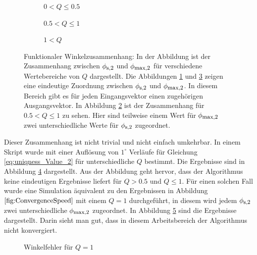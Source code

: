 	
\begin{figure}
\centering
	\begin{subfigure}{0.3\textwidth}
		\caption{$0<Q\leq0.5$}
		\label{fig:0_05_Unique}
	\end{subfigure}
	\hspace{1mm}
	\begin{subfigure}{0.3\textwidth}
		\caption{$0.5<Q\leq1$}
		\label{fig:05_10_unique}
	\end{subfigure}
		\hspace{1mm}
	\begin{subfigure}{0.3\textwidth}
		\caption{$1<Q$}
		\label{fig:bigger1_unique}
	\end{subfigure}
	\caption{ Funktionaler Winkelzusammenhang: In der Abbildung ist der Zusammenhang zwischen $\phi_{\textrm{\footnotesize{s,2}}}$ und $\phi_{\textrm{\footnotesize{max,2}}}$ für verschiedene Wertebereiche von $Q$ dargestellt. Die Abbildungen \ref{fig:0_05_Unique} und \ref{fig:bigger1_unique} zeigen eine eindeutige Zuordnung zwischen $\phi_{\textrm{\footnotesize{s,2}}}$ und $\phi_{\textrm{\footnotesize{max,2}}}$. In diesem Bereich gibt es für jeden Eingangsvektor einen zugehörigen Ausgangsvektor. In Abbildung \ref{fig:05_10_unique} ist der Zusammenhang für $0.5 < Q \leq 1$ zu sehen. Hier sind teilweise einem Wert für $\phi_{\textrm{\footnotesize{max,2}}}$ zwei unterschiedliche Werte für $\phi_{\textrm{\footnotesize{s,2}}}$ zugeordnet.}
	\label{fig:uniqueness}
\end{figure}

Dieser Zusammenhang ist nicht trivial und nicht einfach umkehrbar. In einem Skript wurde mit einer Auflösung von $1^\circ$ Verläufe für Gleichung \ref{eq:uniqness_Value_2} für unterschiedliche $Q$ bestimmt. Die Ergebnisse sind in Abbildung \ref{fig:uniqueness} dargestellt. Aus der Abbildung geht hervor, dass der Algorithmus keine eindeutigen Ergebnisse liefert für $Q>0.5$ und $Q\leq1$. Für einen solchen Fall wurde eine Simulation äquivalent zu den Ergebnissen in Abbildung $\ref{fig:ConvergenceSpeed}$ mit einem $Q=1$ durchgeführt, in diesem wird jedem $\phi_{\textrm{\footnotesize{s,2}}}$ zwei unterschiedliche $\phi_{\textrm{\footnotesize{max,2}}}$ zugeordnet. In Abbildung \ref{fig:NoConvergence} sind die Ergebnisse dargestellt. Darin sieht man gut, dass in diesem Arbeitsbereich der Algorithmus nicht konvergiert. 

\begin{figure}[h]
    \centering
    \caption{Winkelfehler für $Q=1$}
    \label{fig:NoConvergence}
\end{figure}

